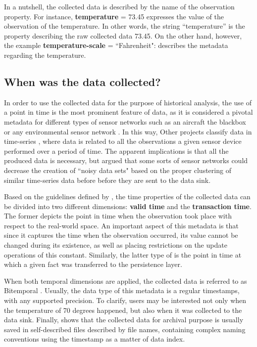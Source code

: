 In a nutshell, the collected data is described by the name of the observation
property. For instance, \textbf{temperature} = 73.45 expresses the value of the
observation of the temperature. In other words, the string ``temperature'' is
the property describing the raw collected data 73.45. On the other hand,
however, the example \textbf{temperature-scale} = ``Fahrenheit": describes
the metadata regarding the temperature.

\subsection{When was the data collected?}

In order to use the collected data for the purpose of historical analysis, the
use of a point in time is the most prominent feature of data, as it is
considered a pivotal metadata for different types of sensor networks such as
an aircraft the blackbox \cite{sn-exemple-blackbox} or any
environmental sensor network \cite{sfbeams2006, sn-xml-middleware, sn-ex01}.
In this way, Other projects classify data in time-series
\cite{sn-time-series-example}, where data is related to all the
observations a given sensor device performed over a period of time. The
apparent implications is that all the produced data is necessary, but
\cite{sn-time-series} argued that some sorts of sensor networks could decrease
the creation of ``noisy data sets" based on the proper clustering of
similar time-series data before before they are sent to the data sink. 

Based on the guidelines defined by \cite{db-temporal}, the time properties of
the collected data can be divided into two different dimensions: \textbf{valid
time} and the \textbf{transaction time}. The former depicts the point in time
when the observation took place with respect to the real-world space. An
important aspect of this metadata is that since it captures the time when the
observation occurred, its value cannot be changed during its existence, as well
as placing restrictions on the update operations of this constant. Similarly,
the latter type of is the point in time at which a given fact was transferred
to the persistence layer.

When both temporal dimensions are applied, the collected data is referred to as
Bitemporal \cite{db-temporal}. Usually, the data type of this metadata is a
regular timestamps, with any supported precision. To clarify, users may be
interested not only when the temperature of 70 degrees happened, but also when
it was collected to the data sink. Finally, \cite{sn-provenance} shows that
the collected data for archival purpose is usually saved in self-described
files described by file names, containing complex naming conventions using the 
timestamp as a matter of data index.

